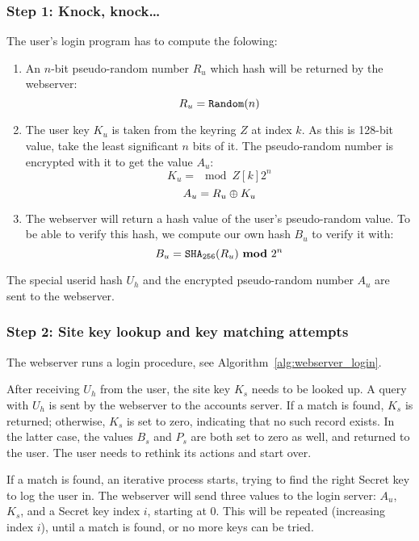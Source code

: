 \subsubsection{Step 1: Knock, knock\ldots}
\label{sec:login_step1}
The user's login program has to compute the folowing:
\begin{enumerate}
\item An $n$-bit pseudo-random number $R_u$ which hash will be returned by the webserver:
\[R_u=\texttt{Random}(n)\]
\item The user key $K_u$ is taken from the keyring $Z$ at index $k$.
As this is 128-bit value,
take the least significant $n$ bits of it.
The pseudo-random number is encrypted with it to get the value $A_u$:
\[K_u=\mod{Z[k]}{2^n}\]
\[A_u=R_u\oplus K_u\]
\item The webserver will return a hash value of the user's pseudo-random value.
To be able to verify this hash,
we compute our own hash $B_u$ to verify it with:
\[B_u=\texttt{\ensuremath{\mathtt{SHA_{256}}}}(R_u)\ \textbf{mod}\ 2^{n}\]
\end{enumerate}
The special userid hash $U_h$ and the encrypted pseudo-random number $A_u$ are sent to the webserver.

\subsubsection{Step 2: Site key lookup and key matching attempts}
\label{sec:login_step2}
The webserver runs a login procedure,
see Algorithm~\vref{alg:webserver_login}.
\par
After receiving $U_h$ from the user, the site key $K_s$ needs to be looked up.
A query with $U_h$ is sent by the webserver to the accounts server.
If a match is found, $K_s$ is returned;
otherwise, $K_s$ is set to zero, indicating that no such record exists.
In the latter case, the values $B_s$ and $P_s$ are both set to zero as well, and returned to the user.
The user needs to rethink its actions and start over.
\par
If a match is found,
an iterative process starts,
trying to find the right Secret key to log the user in.
The webserver will send three values to the login server:
$A_u$,
$K_s$,
and a Secret key index $i$,
starting at 0.
This will be repeated
(increasing index $i$),
until a match is found,
or no more keys can be tried.

